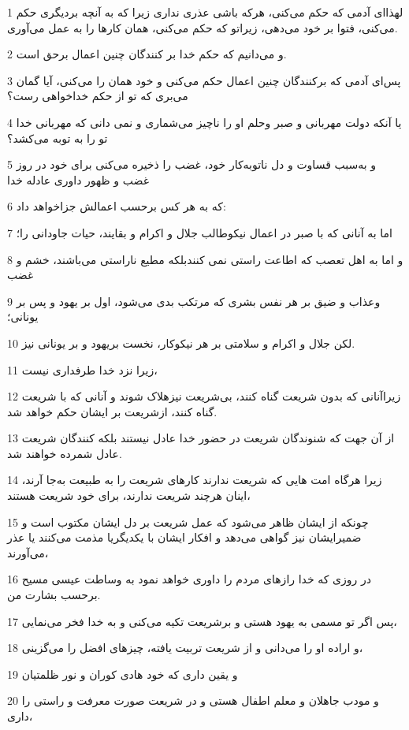 \par 1 لهذا‌ای آدمی که حکم می‌کنی، هر‌که باشی عذری نداری زیرا که به آنچه بردیگری حکم می‌کنی، فتوا بر خود می‌دهی، زیراتو که حکم می‌کنی، همان کارها را به عمل می‌آوری.
\par 2 و می‌دانیم که حکم خدا بر کنندگان چنین اعمال بر‌حق است.
\par 3 پس‌ای آدمی که برکنندگان چنین اعمال حکم می‌کنی و خود همان را می‌کنی، آیا گمان می‌بری که تو از حکم خداخواهی رست؟
\par 4 یا آنکه دولت مهربانی و صبر وحلم او را ناچیز می‌شماری و نمی دانی که مهربانی خدا تو را به توبه می‌کشد؟
\par 5 و به‌سبب قساوت و دل ناتوبه‌کار خود، غضب را ذخیره می‌کنی برای خود در روز غضب و ظهور داوری عادله خدا
\par 6 که به هر کس برحسب اعمالش جزاخواهد داد:
\par 7 اما به آنانی که با صبر در اعمال نیکوطالب جلال و اکرام و بقایند، حیات جاودانی را؛
\par 8 و اما به اهل تعصب که اطاعت راستی نمی کنندبلکه مطیع ناراستی می‌باشند، خشم و غضب
\par 9 وعذاب و ضیق بر هر نفس بشری که مرتکب بدی می‌شود، اول بر یهود و پس بر یونانی؛
\par 10 لکن جلال و اکرام و سلامتی بر هر نیکوکار، نخست بریهود و بر یونانی نیز.
\par 11 زیرا نزد خدا طرفداری نیست،
\par 12 زیراآنانی که بدون شریعت گناه کنند، بی‌شریعت نیزهلاک شوند و آنانی که با شریعت گناه کنند، ازشریعت بر ایشان حکم خواهد شد.
\par 13 از آن جهت که شنوندگان شریعت در حضور خدا عادل نیستند بلکه کنندگان شریعت عادل شمرده خواهند شد.
\par 14 زیرا هرگاه امت هایی که شریعت ندارند کارهای شریعت را به طبیعت به‌جا آرند، اینان هرچند شریعت ندارند، برای خود شریعت هستند،
\par 15 چونکه از ایشان ظاهر می‌شود که عمل شریعت بر دل ایشان مکتوب است و ضمیرایشان نیز گواهی می‌دهد و افکار ایشان با یکدیگریا مذمت می‌کنند یا عذر می‌آورند،
\par 16 در روزی که خدا رازهای مردم را داوری خواهد نمود به وساطت عیسی مسیح برحسب بشارت من.
\par 17 پس اگر تو مسمی به یهود هستی و برشریعت تکیه می‌کنی و به خدا فخر می‌نمایی،
\par 18 و اراده او را می‌دانی و از شریعت تربیت یافته، چیزهای افضل را می‌گزینی،
\par 19 و یقین داری که خود هادی کوران و نور ظلمتیان
\par 20 و مودب جاهلان و معلم اطفال هستی و در شریعت صورت معرفت و راستی را داری،
